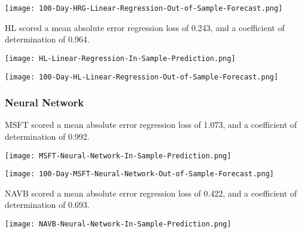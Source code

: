 \begin{center}  
    \texttt{[image: 100-Day-HRG-Linear-Regression-Out-of-Sample-Forecast.png]}
    \label{fig:nonfloat}
\end{center}

HL scored a mean absolute error regression loss of 0.243, and a coefficient of determination of 0.964.

\begin{center}
    \texttt{[image: HL-Linear-Regression-In-Sample-Prediction.png]}
    \label{fig:nonfloat}
\end{center}

\begin{center}  
    \texttt{[image: 100-Day-HL-Linear-Regression-Out-of-Sample-Forecast.png]}
    \label{fig:nonfloat}
\end{center}

\subsubsection{Neural Network}
MSFT scored a mean absolute error regression loss of 1.073, and a coefficient of determination of 0.992.

\begin{center}
    \texttt{[image: MSFT-Neural-Network-In-Sample-Prediction.png]}
    \label{fig:nonfloat}
\end{center}

\begin{center}  
    \texttt{[image: 100-Day-MSFT-Neural-Network-Out-of-Sample-Forecast.png]}
    \label{fig:nonfloat}
\end{center}

NAVB scored a mean absolute error regression loss of 0.422, and a coefficient of determination of 0.693.

\begin{center}
    \texttt{[image: NAVB-Neural-Network-In-Sample-Prediction.png]}
    \label{fig:nonfloat}
\end{center}

